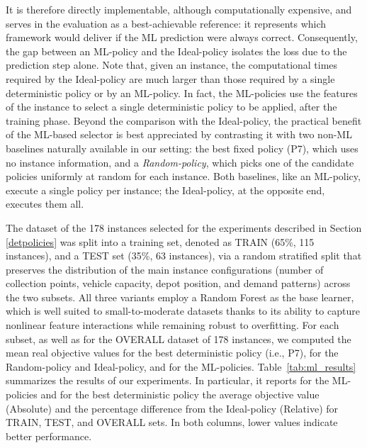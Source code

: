 \documentclass[authoryear,preprint,12pt]{elsarticle}
\newcommand{\sm}[1]{\textcolor{orange}{{#1}}}
\begin{document}
%
It is therefore directly implementable, although computationally expensive, and serves in the evaluation as a best-achievable reference: it represents which framework would deliver if the ML prediction were always correct. Consequently, the gap between an ML-policy and the Ideal-policy isolates the loss due to the prediction step alone.
Note that, given an instance, the computational times required by the Ideal-policy are much larger than those required by a single deterministic policy or by an ML-policy. In fact, the ML-policies use the features of the instance to select a single deterministic policy to be applied, after the training phase.  
Beyond the comparison with the Ideal-policy, the practical benefit of the ML-based selector is best appreciated by contrasting it with two non-ML baselines naturally available in our setting: the best fixed policy (P7), which uses no instance information, and a \textit{Random-policy}, which picks one of the candidate policies uniformly at random for each instance. Both baselines, like an ML-policy, execute a single policy per instance; the Ideal-policy, at the opposite end, executes them all.

The dataset of the 178 instances selected for the experiments described in Section \ref{detpolicies} was split into a training set, denoted as TRAIN (65\%, 115 instances), and a TEST set (35\%, 63 instances), via a random stratified split that preserves the distribution of the main instance configurations (number of collection points, vehicle capacity, depot position, and demand patterns) across the two subsets.
All three variants employ a Random Forest as the base learner, which is well suited to small-to-moderate datasets thanks to its ability to capture nonlinear feature interactions while remaining robust to overfitting.
For each subset, as well as for the OVERALL dataset of 178 instances, we computed the mean real objective values for the best deterministic policy (i.e., P7), for the Random-policy and Ideal-policy, and for the ML-policies. Table~\ref{tab:ml_results} summarizes the results of our experiments. In particular, it reports for the ML-policies and for the best deterministic policy the average objective value (Absolute) and the percentage difference from the Ideal-policy (Relative) for TRAIN, TEST, and OVERALL sets. In both columns, lower values indicate better performance.  
\end{document}
